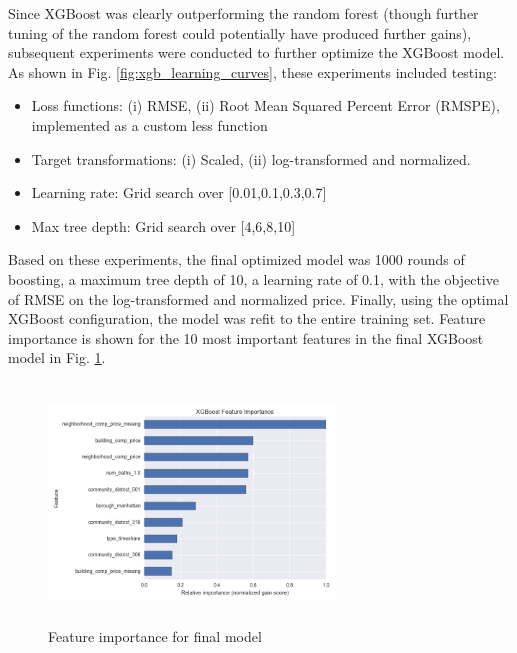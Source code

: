 \documentclass[journal]{IEEEtran}
\begin{document}
Since XGBoost was clearly outperforming the random forest (though further tuning of the random forest could potentially have produced further gains), subsequent experiments were conducted to further optimize the XGBoost model. As shown in Fig. \ref{fig:xgb_learning_curves}, these experiments included testing:
\begin{itemize}
\item Loss functions: (i) RMSE, (ii) Root Mean Squared Percent Error (RMSPE), implemented as a custom less function
\item Target transformations: (i) Scaled, (ii) log-transformed and normalized. 
\item Learning rate: Grid search over [0.01,0.1,0.3,0.7]
\item Max tree depth: Grid search over [4,6,8,10]
\end{itemize}

Based on these experiments, the final optimized model was 1000 rounds of boosting, a maximum tree depth of 10, a learning rate of 0.1, with the objective of RMSE on the log-transformed and normalized price. Finally, using the optimal XGBoost configuration, the model was refit to the entire training set. Feature importance is shown for the 10 most important features in the final XGBoost model in Fig. \ref{fig:feature_import}.

\begin{figure}[!h]
    \centering
    \includegraphics[width=3in,height=2.5in,clip,keepaspectratio]{XGB_model_3_feature_importance.png}
    \caption{Feature importance for final model}
    \label{fig:feature_import}
\end{figure}
\end{document}
